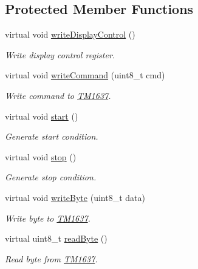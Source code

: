 \subsection*{Protected Member Functions}
\begin{DoxyCompactItemize}
\item 
virtual void \hyperlink{class_t_m1637_a3e4118a501e8a1e9d40052963fdd2aa6}{write\+Display\+Control} ()\hypertarget{class_t_m1637_a3e4118a501e8a1e9d40052963fdd2aa6}{}\label{class_t_m1637_a3e4118a501e8a1e9d40052963fdd2aa6}

\begin{DoxyCompactList}\small\item\em Write display control register. \end{DoxyCompactList}\item 
virtual void \hyperlink{class_t_m1637_a68fb2ceb43b44bbc35443847f0647b94}{write\+Command} (uint8\+\_\+t cmd)\hypertarget{class_t_m1637_a68fb2ceb43b44bbc35443847f0647b94}{}\label{class_t_m1637_a68fb2ceb43b44bbc35443847f0647b94}

\begin{DoxyCompactList}\small\item\em Write command to \hyperlink{class_t_m1637}{T\+M1637}. \end{DoxyCompactList}\item 
virtual void \hyperlink{class_t_m1637_a702d92d99bf11ec5458b1033b42d00d5}{start} ()\hypertarget{class_t_m1637_a702d92d99bf11ec5458b1033b42d00d5}{}\label{class_t_m1637_a702d92d99bf11ec5458b1033b42d00d5}

\begin{DoxyCompactList}\small\item\em Generate start condition. \end{DoxyCompactList}\item 
virtual void \hyperlink{class_t_m1637_ac80f4263462c6d1a605d100eaaed27e9}{stop} ()\hypertarget{class_t_m1637_ac80f4263462c6d1a605d100eaaed27e9}{}\label{class_t_m1637_ac80f4263462c6d1a605d100eaaed27e9}

\begin{DoxyCompactList}\small\item\em Generate stop condition. \end{DoxyCompactList}\item 
virtual void \hyperlink{class_t_m1637_a52c3d43ff1b5ffdb3ff458871fc171de}{write\+Byte} (uint8\+\_\+t data)
\begin{DoxyCompactList}\small\item\em Write byte to \hyperlink{class_t_m1637}{T\+M1637}. \end{DoxyCompactList}\item 
virtual uint8\+\_\+t \hyperlink{class_t_m1637_a61479ccbd98a84c00f498c32b213c470}{read\+Byte} ()
\begin{DoxyCompactList}\small\item\em Read byte from \hyperlink{class_t_m1637}{T\+M1637}. \end{DoxyCompactList}\end{DoxyCompactItemize}
